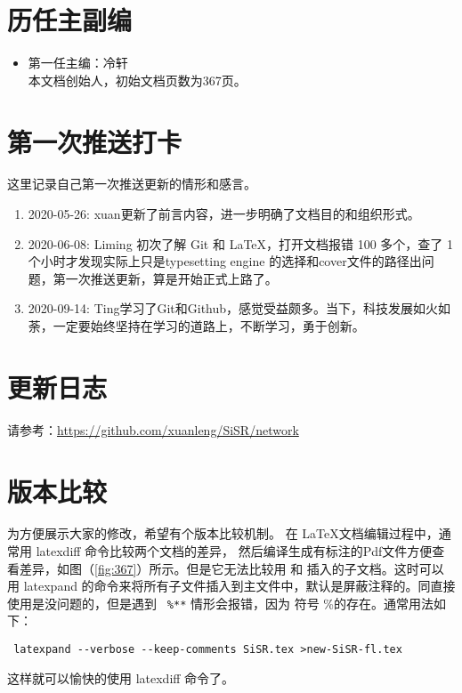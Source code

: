 \documentclass[cn,11pt,chinese,twoside]{elegantbook}
\begin{document}
\section*{历任主副编}
\begin{itemize}
\item 第一任主编：冷轩\\
本文档创始人，初始文档页数为367页。
\end{itemize}



\section*{第一次推送打卡}
这里记录自己第一次推送更新的情形和感言。
\begin{enumerate}
\item 2020-05-26: xuan更新了前言内容，进一步明确了文档目的和组织形式。
\item 2020-06-08: Liming 初次了解 Git 和 \LaTeX{}，打开文档报错 100 多个，查了 1 个小时才发现实际上只是typesetting engine 的选择和cover文件的路径出问题，第一次推送更新，算是开始正式上路了。
\item 2020-09-14: Ting学习了Git和Github，感觉受益颇多。当下，科技发展如火如荼，一定要始终坚持在学习的道路上，不断学习，勇于创新。
\end{enumerate}


\section*{更新日志}
请参考：\url{https://github.com/xuanleng/SiSR/network}


\section*{版本比较}
为方便展示大家的修改，希望有个版本比较机制。 在 \LaTeX 文档编辑过程中，通常用 latexdiff  命令比较两个文档的差异， 然后编译生成有标注的Pdf文件方便查看差异，如图（\ref{fig:367}）所示。但是它无法比较用 \verb|| 和 \verb|| 插入的子文档。这时可以用 latexpand 的命令来将所有子文件插入到主文件中，默认是屏蔽注释的。同直接使用是没问题的，但是遇到 \verb| %**|
 情形会报错，因为 符号 \%的存在。通常用法如下：
\begin{verbatim}
 latexpand --verbose --keep-comments SiSR.tex >new-SiSR-fl.tex
\end{verbatim}
这样就可以愉快的使用 latexdiff 命令了。
\end{document}
